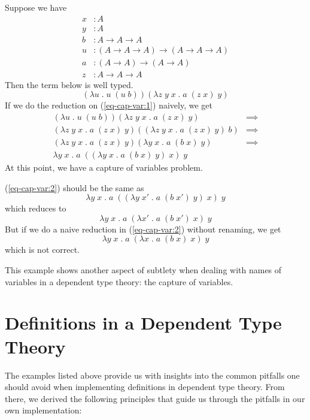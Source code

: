\begin{example}\label{theory:exa3}
  Suppose we have
  \begin{align*}
    x &: A \\
    y &: A \\
    b &: A \to A \to A \\
    u &: (A \to A \to A) \to (A \to A \to A) \\
    a &: (A \to A) \to (A \to A) \\
    z &: A \to A \to A
  \end{align*}
  Then the term below is well typed.
  \begin{equation} \label{eq-cap-var:1}
    (\lambda u \; . \; u \; (u \; b)) (\lambda z \; y \; x \; . \; a \; (z \; x) \; y)
  \end{equation}
  If we do the reduction on (\ref{eq-cap-var:1}) naively, we get
  \begin{align}
    (\lambda u \; . \; u \; (u \; b)) (\lambda z \; y \; x \; . \; a \; (z \; x) \; y) & \implies \nonumber \\
    (\lambda z \; y \; x \; . \; a \; (z \; x) \; y) ((\lambda z \; y \; x \; . \; a \; (z \; x) \; y) \; b) & \implies \nonumber \\
    (\lambda z \; y \; x \; . \; a \; (z \; x) \; y) (\lambda y \; x \; . \; a \; (b \; x) \; y) & \implies \nonumber \\
    \lambda y \; x \; . \; a \; ((\lambda y \; x \; . \; a \; (b \; x) \; y)\; x) \; y \label{eq-cap-var:2}
  \end{align}
  At this point, we have a capture of variables problem.

  (\ref{eq-cap-var:2}) should be the same as
  \[ \lambda y \; x \; . \; a \; ((\lambda y \; x' \; . \; a \; (b \; x') \; y)\; x) \; y \]
  which reduces to
  \[ \lambda y \; x \; . \; a \; (\lambda x' \; . \; a \; (b \; x') \; x) \; y \]
  But if we do a naive reduction in (\ref{eq-cap-var:2}) without renaming, we get 
  \[ \lambda y \; x \; . \; a \; (\lambda x \; . \; a \; (b \; x) \; x) \; y \]
  which is not correct.

  This example shows another aspect of subtlety when dealing with names of variables in a dependent type theory: the capture of variables.
\end{example}

\section{Definitions in a Dependent Type Theory} \label{sec:theory:definition}
The examples listed above provide us with insights into the common pitfalls one should avoid when implementing definitions in dependent type theory. From there, we derived the following principles that guide us through the pitfalls in our own implementation:

